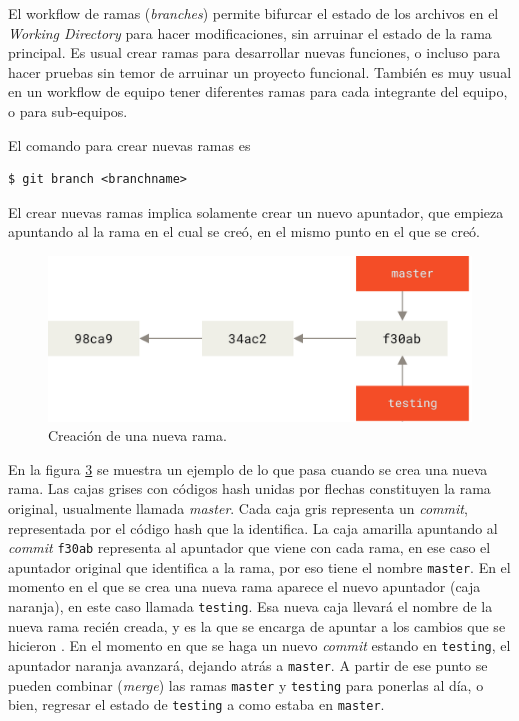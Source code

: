 \documentclass[spanish, 12pt, a4paper]{article}
\begin{document}
El workflow de ramas (\emph{branches}) permite bifurcar el estado de los
archivos en el \emph{Working Directory} para hacer modificaciones, sin
arruinar el estado de la rama principal. Es usual crear ramas para
desarrollar nuevas funciones, o incluso para hacer pruebas sin temor de
arruinar un proyecto funcional. También es muy usual en un workflow de
equipo tener diferentes ramas para cada integrante del equipo, o para
sub-equipos.

El comando para crear nuevas ramas es

\begin{lstlisting}
$ git branch <branchname>
\end{lstlisting}

El crear nuevas ramas implica solamente crear un nuevo apuntador, que
empieza apuntando al la rama en el cual se creó, en el mismo punto en el
que se creó.

\begin{figure}
\centering
\includegraphics{figs/two-branches.png}
\caption{Creación de una nueva rama.{}}
\end{figure}

En la figura \protect\hyperlink{fig:two-branches}{3} se muestra un
ejemplo de lo que pasa cuando se crea una nueva rama. Las cajas grises
con códigos hash unidas por flechas constituyen la rama original,
usualmente llamada \emph{master}. Cada caja gris representa un
\emph{commit}, representada por el código hash que la identifica. La
caja amarilla apuntando al \emph{commit} \passthrough{\lstinline!f30ab!}
representa al apuntador que viene con cada rama, en ese caso el
apuntador original que identifica a la rama, por eso tiene el nombre
\passthrough{\lstinline!master!}. En el momento en el que se crea una
nueva rama aparece el nuevo apuntador (caja naranja), en este caso
llamada \passthrough{\lstinline!testing!}. Esa nueva caja llevará el
nombre de la nueva rama recién creada, y es la que se encarga de apuntar
a los cambios que se hicieron . En el momento en que se haga un nuevo
\emph{commit} estando en \passthrough{\lstinline!testing!}, el apuntador
naranja avanzará, dejando atrás a \passthrough{\lstinline!master!}. A
partir de ese punto se pueden combinar (\emph{merge}) las ramas
\passthrough{\lstinline!master!} y \passthrough{\lstinline!testing!}
para ponerlas al día, o bien, regresar el estado de
\passthrough{\lstinline!testing!} a como estaba en
\passthrough{\lstinline!master!}.
\end{document}
